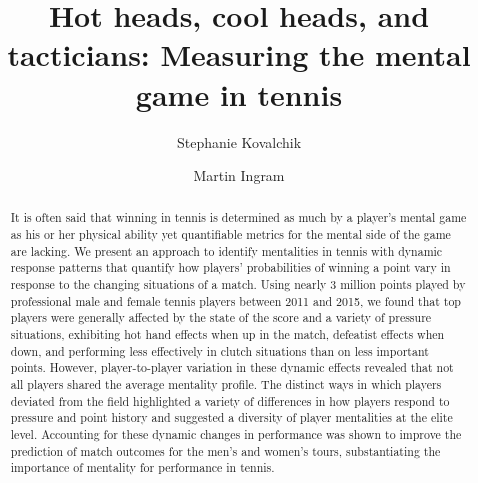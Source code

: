 \documentclass{Latex/svjour3}
\begin{document}
\title{Hot heads, cool heads, and tacticians: Measuring the mental game in
  tennis}



\author{Stephanie Kovalchik\and Martin Ingram}


\date{}

\maketitle

\begin{abstract}

It is often said that winning in tennis is determined as much by a player's
mental game as his or her physical ability yet quantifiable metrics for the
mental side of the game are lacking. We present an approach to identify
mentalities in tennis with dynamic response patterns that quantify how players'
probabilities of winning a point vary in response to the changing situations of
a match. Using nearly 3 million points played by professional male and female
tennis players between 2011 and 2015, we found that top players  were generally affected by the state of the score and
a variety of pressure situations, exhibiting hot hand effects when up in the
match, defeatist effects when down, and performing less effectively in clutch
situations than on less important points. However, player-to-player variation in
these dynamic effects revealed that not all players shared the average mentality
profile. The distinct ways in which players deviated from the field highlighted
a variety of differences in how players respond to pressure and point history
and suggested a diversity of player mentalities at the elite level. Accounting
for these dynamic changes in performance was shown to improve the prediction of
match outcomes for the men's and women's tours, substantiating the importance of
mentality for performance in tennis.


\end{abstract}
\end{document}
